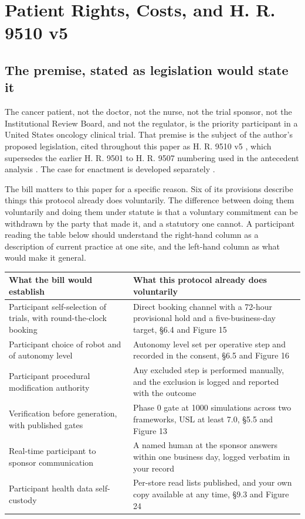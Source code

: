 \section{Patient Rights, Costs, and H. R. 9510 v5}

\subsection{The premise, stated as legislation would state it}

The cancer patient, not the doctor, not the nurse, not the trial sponsor, not
the Institutional Review Board, and not the regulator, is the priority
participant in a United States oncology clinical trial. That premise is the
subject of the author's proposed legislation, cited throughout this paper as
H. R. 9510 v5 \cite{hr9510billv5}, which supersedes the earlier H. R. 9501 to
H. R. 9507 numbering used in the antecedent analysis \cite{paibillprior}. The
case for enactment is developed separately \cite{congress9510, fedlawhr9510}.

The bill matters to this paper for a specific reason. Six of its provisions
describe things this protocol already does voluntarily. The difference between
doing them voluntarily and doing them under statute is that a voluntary
commitment can be withdrawn by the party that made it, and a statutory one
cannot. A participant reading the table below should understand the right-hand
column as a description of current practice at one site, and the left-hand
column as what would make it general.

\vspace{0.30em}

\noindent\begin{tabularx}{\textwidth}{L{4.3cm} Y}
\toprule
\textbf{What the bill would establish} & \textbf{What this protocol already does voluntarily} \\
\midrule
Participant self-selection of trials, with round-the-clock booking & Direct booking channel with a 72-hour provisional hold and a five-business-day target, \S 6.4 and Figure 15 \\
Participant choice of robot and of autonomy level & Autonomy level set per operative step and recorded in the consent, \S 6.5 and Figure 16 \\
Participant procedural modification authority & Any excluded step is performed manually, and the exclusion is logged and reported with the outcome \\
Verification before generation, with published gates & Phase 0 gate at 1000 simulations across two frameworks, USL at least 7.0, \S 5.5 and Figure 13 \\
Real-time participant to sponsor communication & A named human at the sponsor answers within one business day, logged verbatim in your record \\
Participant health data self-custody & Per-store read lists published, and your own copy available at any time, \S 9.3 and Figure 24 \\
\bottomrule
\end{tabularx}

